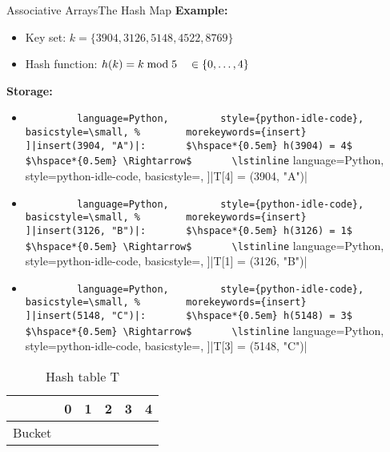 \begin{frame}{Associative Arrays}{The Hash Map}
  \textbf{Example:}
  \begin{itemize}
    \item
      Key set: $k = \{3904, 3126, 5148, 4522, 8769\}$
    \item
      Hash function:
      $h(k) = k \;\mathrm{mod}\; 5 \hspace*{1.0em} \in \{0, \ldots, 4\}$
  \end{itemize}
  \textbf{Storage:}
  \begin{itemize}
    \item
      \lstinline[
        language=Python,
        style={python-idle-code},
        basicstyle=\small,
      ]|insert(3904, "A")|:
      $\hspace*{0.5em} h(3904) = 4$
      $\hspace*{0.5em} \Rightarrow$
      \lstinline[
        language=Python,
        style={python-idle-code},
        basicstyle=\small,
      ]|T[4] = (3904, "A")|
    \item
      \lstinline[
        language=Python,
        style={python-idle-code},
        basicstyle=\small,
      ]|insert(3126, "B")|:
      $\hspace*{0.5em} h(3126) = 1$
      $\hspace*{0.5em} \Rightarrow$
      \lstinline[
        language=Python,
        style={python-idle-code},
        basicstyle=\small,
      ]|T[1] = (3126, "B")|
    \item
      \lstinline[
        language=Python,
        style={python-idle-code},
        basicstyle=\small,
      ]|insert(5148, "C")|:
      $\hspace*{0.5em} h(5148) = 3$
      $\hspace*{0.5em} \Rightarrow$
      \lstinline[
        language=Python,
        style={python-idle-code},
        basicstyle=\small,
      ]|T[3] = (5148, "C")|
  \end{itemize}
  \vspace*{-1.0em}
  \begin{table}[!b]
    \caption{Hash table T}
    \label{tab:hash_table_example_introduction}
    \begin{tabularx}{0.875\textwidth}{l|ccccc}
      {} & 0 & 1 & 2 & 3 & 4\\
      \midrule
      Bucket &
      {} &
      \lstinline[
        language=Python,
        style={python-idle-code},
        basicstyle=\small
      ]|(3126, "B")| &
      {} &
      \lstinline[
        language=Python,
        style={python-idle-code},
        basicstyle=\small
      ]|(5148, "C")| &
      \lstinline[
        language=Python,
        style={python-idle-code},
        basicstyle=\small
      ]|(3904, "A")|
    \end{tabularx}
  \end{table}
\end{frame}

